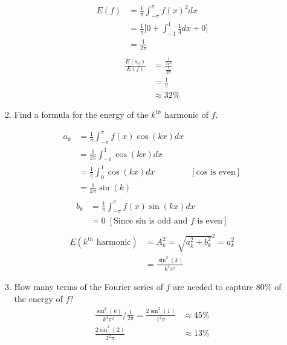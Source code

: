 \documentclass{article}
\begin{document}
\begin{enumerate}
\begin{enumerate}
\begin{multicols}{2}
\begin{align*}
        \end{align*}
        \begin{align*}
            E(f) &= \frac{1}{\pi} \int^{\pi}_{-\pi}f(x)^2dx\\
            &= \frac{1}{\pi}\Bigg[ 0  + \int_{-1}^{1}\frac{1}{4}dx + 0 \Bigg]\\
            &= \frac{1}{2\pi} \\
        \end{align*}
        \begin{align*}
            \frac{E(a_0)}{E(f)} &= \frac{\frac{1}{2\pi^2}}{\frac{1}{2\pi}} \\
            &= \frac{1}{\pi} \\
            &\approx 32\%
        \end{align*}
    \end{multicols}
    \item Find a formula for the energy of the $k^{th}$ harmonic of $f$.
    \begin{multicols}{2}
    \begin{align*}
            a_k &= \frac{1}{\pi} \int_{-\pi}^{\pi}f(x)\cos(kx)dx\\
            &= \frac{1}{2\pi} \int_{-1}^{1}\cos(kx)dx\\
            &= \frac{1}{\pi} \int_{0}^{1}\cos(kx)dx &[\text{cos is even}] \\
            &= \frac{1}{k\pi} \sin(k) \\
            \end{align*}
    \begin{align*}
            b_k &= \frac{1}{\pi} \int_{-\pi}^{\pi}f(x)\sin(kx) dx \\
            &= 0 \; [\text{Since sin is odd and $f$ is even}] \\
    \end{align*}
    \begin{align*}
        E(k^{th} \text{ harmonic}) &= A_k^2 = \sqrt{a_k^2+b_k^2}^2 = a_k^2 \\
        &= \frac{\sin^2(k)}{k^2\pi^2}
    \end{align*}
    \end{multicols}
    \item How many terms of the Fourier series of $f$ are needed to capture 80\% of the energy of $f$?
    \begin{align*}
       \frac{\sin^2(k)}{k^2\pi^2}/\frac{1}{2\pi} = \frac{2\sin^2(1)}{1^2\pi} &\approx 45\%  \\
       \frac{2\sin^2(2)}{2^2\pi} &\approx 13\% \\

\end{align*}
\end{enumerate}
\end{enumerate}
\end{document}
